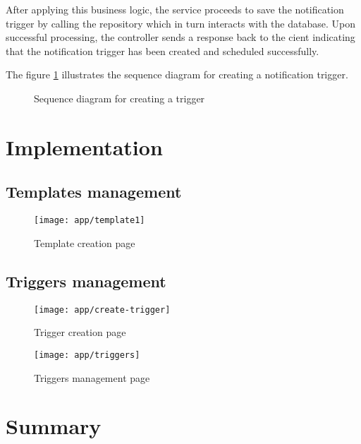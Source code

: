 After applying this business logic, the service proceeds to save the notification trigger by calling
the repository which in turn interacts with the database. Upon successful processing, the controller sends
a response back to the cient indicating that the notification trigger has been created and scheduled successfully.

\noindent The figure \ref{seq-create-trigger} illustrates the sequence diagram for creating a notification trigger.


\begin{landscape}
    \begin{figure}[hbt!]
        \centering
        
        \caption{Sequence diagram for creating a trigger}
        \label{seq-create-trigger}
    \end{figure}
\end{landscape}

\section{Implementation}

\subsection{Templates management}
\begin{figure}[hbt!]
    \centering
    \texttt{[image: app/template1]}
    \caption{Template creation page}
    \label{ss-template}
\end{figure}

\subsection{Triggers management}

\begin{figure}[hbt!]
    \centering
    \texttt{[image: app/create-trigger]}
    \caption{Trigger creation page}
    \label{ss-create-trigger}
\end{figure}

\begin{figure}[hbt!]
    \centering
    \texttt{[image: app/triggers]}
    \caption{Triggers management page}
    \label{ss-triggers}
\end{figure}


\section*{Summary}
